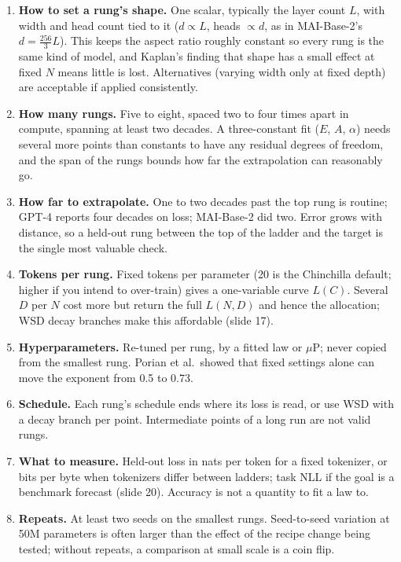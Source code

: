 \documentclass[11pt,letterpaper]{article}
\begin{document}
\begin{enumerate}[label=\arabic*.]
\item \textbf{How to set a rung's shape.} One scalar, typically the layer count $L$, with width and head count tied to it ($d\propto L$, heads $\propto d$, as in MAI-Base-2's $d=\tfrac{256}{3}L$). This keeps the aspect ratio roughly constant so every rung is the same kind of model, and Kaplan's finding that shape has a small effect at fixed $N$ means little is lost. Alternatives (varying width only at fixed depth) are acceptable if applied consistently.
\item \textbf{How many rungs.} Five to eight, spaced two to four times apart in compute, spanning at least two decades. A three-constant fit ($E$, $A$, $\alpha$) needs several more points than constants to have any residual degrees of freedom, and the span of the rungs bounds how far the extrapolation can reasonably go.
\item \textbf{How far to extrapolate.} One to two decades past the top rung is routine; GPT-4 reports four decades on loss; MAI-Base-2 did two. Error grows with distance, so a held-out rung between the top of the ladder and the target is the single most valuable check.
\item \textbf{Tokens per rung.} Fixed tokens per parameter (20 is the Chinchilla default; higher if you intend to over-train) gives a one-variable curve $L(C)$. Several $D$ per $N$ cost more but return the full $L(N,D)$ and hence the allocation; WSD decay branches make this affordable (slide 17).
\item \textbf{Hyperparameters.} Re-tuned per rung, by a fitted law or $\mu$P; never copied from the smallest rung. Porian et al.\ showed that fixed settings alone can move the exponent from 0.5 to 0.73.
\item \textbf{Schedule.} Each rung's schedule ends where its loss is read, or use WSD with a decay branch per point. Intermediate points of a long run are not valid rungs.
\item \textbf{What to measure.} Held-out loss in nats per token for a fixed tokenizer, or bits per byte when tokenizers differ between ladders; task NLL if the goal is a benchmark forecast (slide 20). Accuracy is not a quantity to fit a law to.
\item \textbf{Repeats.} At least two seeds on the smallest rungs. Seed-to-seed variation at 50M parameters is often larger than the effect of the recipe change being tested; without repeats, a comparison at small scale is a coin flip.
\end{enumerate}
\end{document}
